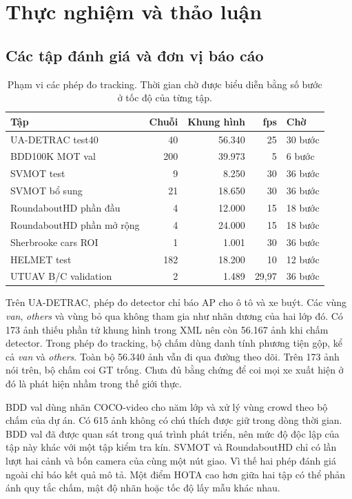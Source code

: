 \chapter{Thực nghiệm và thảo luận}
\section{Các tập đánh giá và đơn vị báo cáo}
\begin{table}[htbp]\centering\small
\caption{Phạm vi các phép đo tracking. Thời gian chờ được biểu diễn bằng số bước ở tốc độ của từng tập.}\label{tab:splits}
\begin{tabular}{lrrrl}\hline
Tập & Chuỗi & Khung hình & fps & Chờ\\\hline
UA-DETRAC test40 & 40 & 56.340 & 25 & 30 bước\\
BDD100K MOT val & 200 & 39.973 & 5 & 6 bước\\
SVMOT test & 9 & 8.250 & 30 & 36 bước\\
SVMOT bổ sung & 21 & 18.650 & 30 & 36 bước\\
RoundaboutHD phần đầu & 4 & 12.000 & 15 & 18 bước\\
RoundaboutHD phần mở rộng & 4 & 24.000 & 15 & 18 bước\\
Sherbrooke cars ROI & 1 & 1.001 & 30 & 36 bước\\
HELMET test & 182 & 18.200 & 10 & 12 bước\\
UTUAV B/C validation & 2 & 1.489 & 29,97 & 36 bước\\\hline
\end{tabular}
\end{table}
Trên UA-DETRAC, phép đo detector chỉ báo AP cho ô tô và xe buýt. Các vùng \emph{van}, \emph{others} và vùng bỏ qua không tham gia như nhãn dương của hai lớp đó. Có 173 ảnh thiếu phần tử khung hình trong XML nên còn 56.167 ảnh khi chấm detector. Trong phép đo tracking, bộ chấm dùng danh tính phương tiện gộp, kể cả \emph{van} và \emph{others}. Toàn bộ 56.340 ảnh vẫn đi qua đường theo dõi. Trên 173 ảnh nói trên, bộ chấm coi GT trống. Chưa đủ bằng chứng để coi mọi xe xuất hiện ở đó là phát hiện nhầm trong thế giới thực.

BDD val dùng nhãn COCO-video cho năm lớp và xử lý vùng crowd theo bộ chấm của dự án. Có 615 ảnh không có chú thích được giữ trong dòng thời gian. BDD val đã được quan sát trong quá trình phát triển, nên mức độ độc lập của tập này khác với một tập kiểm tra kín. SVMOT và RoundaboutHD chỉ có lần lượt hai cảnh và bốn camera của cùng một nút giao. Vì thế hai phép đánh giá ngoài chỉ báo kết quả mô tả. Một điểm HOTA cao hơn giữa hai tập có thể phản ánh quy tắc chấm, mật độ nhãn hoặc tốc độ lấy mẫu khác nhau.


